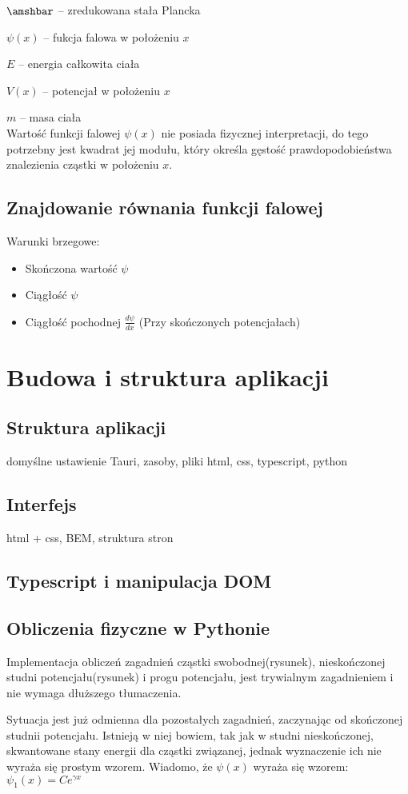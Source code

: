 \documentclass{SGGW-thesis}
\begin{document}
	$\amshbar$ -- zredukowana stała Plancka
	
	$\psi(x)$ -- fukcja falowa w położeniu $x$
	
	$E$ -- energia całkowita ciała
	
	$V(x)$ -- potencjał w położeniu $x$
	
	$m$ -- masa ciała\\
	
	Wartość funkcji falowej $\psi(x)$ nie posiada fizycznej interpretacji, do tego potrzebny jest kwadrat jej modułu, który określa gęstość prawdopodobieństwa znalezienia cząstki w położeniu $x$. 
	\section{Znajdowanie równania funkcji falowej}
	Warunki brzegowe:
	\begin{itemize}
	\item Skończona wartość $\psi$
	\item Ciągłość $\psi$
	\item Ciągłość pochodnej $\frac{d\psi}{dx}$ (Przy skończonych potencjałach)
	\end{itemize}
	
	
\chapter{Budowa i struktura aplikacji}
	\section{Struktura aplikacji}
	domyślne ustawienie Tauri, zasoby, pliki html, css, typescript, python
	\section{Interfejs}
	html + css, BEM, struktura stron
	\section{Typescript i manipulacja DOM}
	\section{Obliczenia fizyczne w Pythonie}
		Implementacja obliczeń zagadnień cząstki swobodnej(rysunek), nieskończonej studni potencjału(rysunek) i progu potencjału, jest trywialnym zagadnieniem i nie wymaga dłuższego tłumaczenia.
		
		Sytuacja jest już odmienna dla pozostałych zagadnień, zaczynając od skończonej studnii potencjału. Istnieją w niej bowiem, tak jak w studni nieskończonej, skwantowane stany energii dla cząstki związanej, jednak wyznaczenie ich nie wyraża się prostym wzorem. Wiadomo, że $\psi(x)$ wyraża się wzorem:
		$\psi_1(x) = Ce^{\gamma x}$
		
\end{document}
